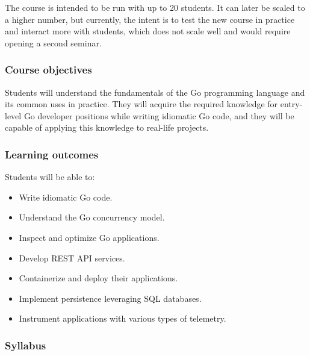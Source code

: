 \documentclass[
  digital,
  color,
  oneside,
  nosansbold,
  nocolorbold,
  lof,
  lot,
]{fithesis4}
\begin{document}
The course is intended to be run with up to 20 students. It can later be scaled to a higher number, but currently, the intent is to test the new course in practice and interact more with students, which does not scale well and would require opening a second seminar.

\subsubsection{Course objectives}

Students will understand the fundamentals of the Go programming language and its common uses in practice. They will acquire the required knowledge for entry-level Go developer positions while writing idiomatic Go code, and they will be capable of applying this knowledge to real-life projects.

\subsubsection{Learning outcomes}

Students will be able to:
\begin{itemize}
    \item Write idiomatic Go code.
    \item Understand the Go concurrency model.
    \item Inspect and optimize Go applications.
    \item Develop REST API services.
    \item Containerize and deploy their applications.
    \item Implement persistence leveraging SQL databases.
    \item Instrument applications with various types of telemetry.
\end{itemize}

\subsubsection{Syllabus}
\end{document}
